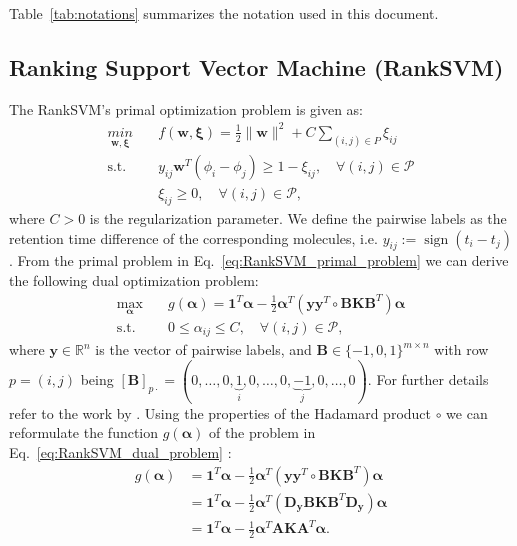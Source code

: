 \documentclass[10p]{article}
\newcommand{\st}{\text{s.t.}}
\newcommand{\defi}{:=}
\newcommand{\balpha}{\boldsymbol{\alpha}}
\newcommand{\bones}{\mathbf{1}}
\newcommand{\numexp}{n}
\newcommand{\numpair}{m}
\newcommand{\Pset}{\mathcal{P}}
\DeclareMathOperator{\sign}{sign}
\begin{document}
Table~\ref{tab:notations} summarizes the notation used in this document.

\subsection{Ranking Support Vector Machine (RankSVM)}

The RankSVM's primal optimization problem is given as: 
\begin{equation}
\begin{split}
    \underset{\mathbf{w},\boldsymbol{\xi}}{min} 
        &\quad f(\mathbf{w},\boldsymbol{\xi}) = \frac{1}{2}\|\mathbf{w}\|^2 + C\sum_{(i,j)\in P}\xi_{ij} \\
    \st &\quad y_{ij}\mathbf{w}^T(\phi_i-\phi_j)\geq 1-\xi_{ij},\quad\forall(i,j)\in\Pset\\
        &\quad \xi_{ij} \geq 0,\quad\forall(i,j)\in\Pset,
    \label{eq:RankSVM_primal_problem}
\end{split}
\end{equation}
where $C>0$ is the regularization parameter. We define the pairwise labels as the retention time difference of the corresponding molecules, i.e. $y_{ij}\defi\sign(t_i-t_j)$. From the primal problem in Eq.~\eqref{eq:RankSVM_primal_problem} we can derive the following dual optimization problem:
\begin{equation}
\begin{split}
    \underset{\balpha}{\max} 
        &\quad g(\balpha) = \bones^T\balpha - \frac{1}{2} \balpha^T\left(\mathbf{y}\mathbf{y}^T\circ\mathbf{B}\mathbf{K}\mathbf{B}^T\right)\balpha \\ 
    \st &\quad 0\leq\alpha_{ij}\leq C,\quad\forall (i,j)\in \Pset,
    \label{eq:RankSVM_dual_problem}
\end{split}
\end{equation}
where $\mathbf{y}\in\mathbb{R}^\numexp$ is the vector of pairwise labels, and $\mathbf{B}\in\{-1,0,1\}^{\numpair\times\numexp}$ with row $p=(i,j)$ being $[\mathbf{B}]_{p\cdot}=(0,\ldots,0,\underbrace{1}_{i},0,\ldots,0,\underbrace{-1}_{j},0,\ldots,0)$. For further details refer to the work by \cite{Kuo2014}. Using the properties of the Hadamard product $\circ$ we can reformulate the function $g(\balpha)$ of the problem in Eq.~\eqref{eq:RankSVM_dual_problem} \parencite{Styan1973}:
\begin{align}
    g(\balpha) 
        &= \bones^T\balpha-\frac{1}{2} \balpha^T\left(\mathbf{y}\mathbf{y}^T\circ\mathbf{B}\mathbf{K}\mathbf{B}^T\right)\balpha \\
        &= \bones^T\balpha-\frac{1}{2} \balpha^T\left(\mathbf{D}_\mathbf{y}\mathbf{B}\mathbf{K}\mathbf{B}^T\mathbf{D}_\mathbf{y}\right)\balpha \\
        &= \bones^T\balpha-\frac{1}{2} \balpha^T\mathbf{A}\mathbf{K}\mathbf{A}^T\balpha.
\end{align}
\end{document}
